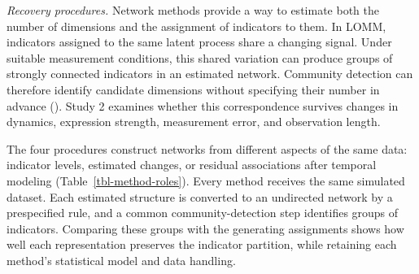\documentclass[
]{article}
\begin{document}
\begin{table}[H]

\caption{\label{tbl-scenario-words}The six Study 2 scenario families.
Numeric activity gains and dwell fractions are in Appendix B; oscillator
parameters are in Table B2.}


\end{table}%

\emph{Recovery procedures.} Network methods provide a way to estimate
both the number of dimensions and the assignment of indicators to them.
In LOMM, indicators assigned to the same latent process share a changing
signal. Under suitable measurement conditions, this shared variation can
produce groups of strongly connected indicators in an estimated network.
Community detection can therefore identify candidate dimensions without
specifying their number in advance (). Study 2 examines whether this correspondence
survives changes in dynamics, expression strength, measurement error,
and observation length.

The four procedures construct networks from different aspects of the
same data: indicator levels, estimated changes, or residual associations
after temporal modeling (Table~\ref{tbl-method-roles}). Every method
receives the same simulated dataset. Each estimated structure is
converted to an undirected network by a prespecified rule, and a common
community-detection step identifies groups of indicators. Comparing
these groups with the generating assignments shows how well each
representation preserves the indicator partition, while retaining each
method's statistical model and data handling.
\end{document}
